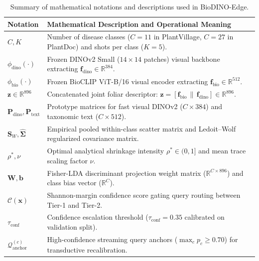 \documentclass[a4paper,fleqn,nologo]{cas-dc}
\begin{document}
\begin{table}[htbp]
\centering
\caption{Summary of mathematical notations and descriptions used in BioDINO-Edge.}
\label{tab:notation}
\small
\begin{tabularx}{\textwidth}{lX}
\toprule
\textbf{Notation} & \textbf{Mathematical Description and Operational Meaning} \\
\midrule
$C, K$ & Number of disease classes ($C=11$ in PlantVillage, $C=27$ in PlantDoc) and shots per class ($K=5$). \\
$\phi_{\text{dino}}(\cdot)$ & Frozen DINOv2 Small ($14\times 14$ patches) visual backbone extracting $\mathbf{f}_{\text{dino}} \in \mathbb{R}^{384}$. \\
$\phi_{\text{bio}}(\cdot)$ & Frozen BioCLIP ViT-B/16 visual encoder extracting $\mathbf{f}_{\text{bio}} \in \mathbb{R}^{512}$. \\
$\mathbf{z} \in \mathbb{R}^{896}$ & Concatenated joint foliar descriptor: $\mathbf{z} = [\mathbf{f}_{\text{bio}} \,\|\, \mathbf{f}_{\text{dino}}] \in \mathbb{R}^{896}$. \\
$\mathbf{P}_{\text{dino}}, \mathbf{P}_{\text{text}}$ & Prototype matrices for fast visual DINOv2 ($C \times 384$) and taxonomic text ($C \times 512$). \\
$\mathbf{S}_W, \hat{\mathbf{\Sigma}}$ & Empirical pooled within-class scatter matrix and Ledoit--Wolf regularized covariance matrix. \\
$\rho^*, \nu$ & Optimal analytical shrinkage intensity $\rho^* \in (0, 1]$ and mean trace scaling factor $\nu$. \\
$\mathbf{W}, \mathbf{b}$ & Fisher-LDA discriminant projection weight matrix ($\mathbb{R}^{C \times 896}$) and class bias vector ($\mathbb{R}^C$). \\
$\mathcal{C}(\mathbf{x})$ & Shannon-margin confidence score gating query routing between Tier-1 and Tier-2. \\
$\tau_{\text{conf}}$ & Confidence escalation threshold ($\tau_{\text{conf}} = 0.35$ calibrated on validation split). \\
$\mathcal{Q}_{\text{anchor}}^{(c)}$ & High-confidence streaming query anchors ($\max_c p_c \ge 0.70$) for transductive recalibration. \\
\bottomrule
\end{tabularx}
\end{table}
\end{document}
